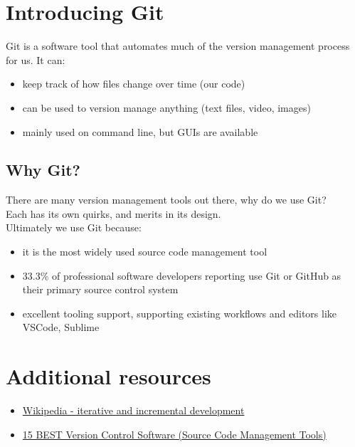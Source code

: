 \section{Introducing Git}

Git is a software tool that automates much of the version management process for us. It can:

\begin{itemize}
    \item keep track of how files change over time (our code)
    \item can be used to version manage anything (text files, video, images)
    \item mainly used on command line, but GUIs are available
\end{itemize}


\subsection{Why Git?}

There are many version management tools out there, why do we use Git?
\\

Each has its own quirks, and merits in its design.
\\

Ultimately we use Git because:

\begin{itemize}
    \item it is the most widely used source code management tool
	\item 33.3\% of professional software developers reporting use Git or GitHub as their primary source control system
	\item excellent tooling support, supporting existing workflows and editors like VSCode, Sublime
\end{itemize}


\section{Additional resources}

\begin{itemize}[leftmargin=*]
    \item \href{https://en.wikipedia.org/wiki/Iterative_and_incremental_development}{Wikipedia - iterative and incremental development }
    \item \href{https://www.softwaretestinghelp.com/version-control-software/}{15 BEST Version Control Software (Source Code Management Tools) }
	
\end{itemize}